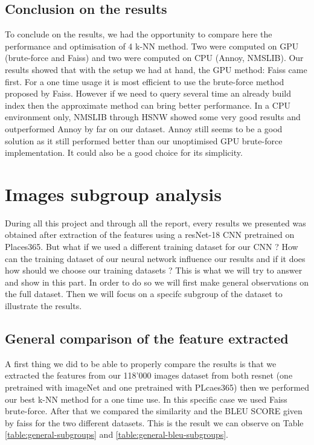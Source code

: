 \documentclass[a4paper]{article}
\begin{document}
\subsection{Conclusion on the results}
	To conclude on the results, we had the opportunity to compare here the performance and optimisation of 4 k-NN method. Two were computed on GPU (brute-force and Faiss) and two were computed on CPU (Annoy, NMSLIB). Our results showed that with the setup we had at hand, the GPU method: Faiss came first. For a one time usage it is most efficient to use the brute-force method proposed by Faiss. However if we need to query several time an already build index then the approximate method can bring better performance. In a CPU environment only, NMSLIB through HSNW showed some very good results and outperformed Annoy by far on our dataset. Annoy still seems to be a good solution as it still performed better than our unoptimised GPU brute-force implementation. It could also be a good choice for its simplicity.

\section{Images subgroup analysis}
	
	During all this project and through all the report, every results we presented was obtained after extraction of the features using a resNet-18 CNN pretrained on Places365. But what if we used a different training dataset for our CNN ? How can the training dataset of our neural network influence our results and if it does how should we choose our training datasets ? This is what we will try to answer and show in this part. In order to do so we will first make general observations on the full dataset. Then we will focus on a specifc subgroup of the dataset to illustrate the results.
	 
	\subsection{General comparison of the feature extracted}
	
	A first thing we did to be able to properly compare the results is that we extracted the features from our 118'000 images dataset from both resnet (one pretrained with imageNet and one pretrained with PLcaes365) then we performed our best k-NN method for a one time use. In this specific case we used Faiss brute-force. After that we compared the similarity and the BLEU SCORE given by faiss for the two different datasets. This is the result we can observe on Table \ref{table:general-subgroups} and \ref{table:general-bleu-subgroups}.
\end{document}
